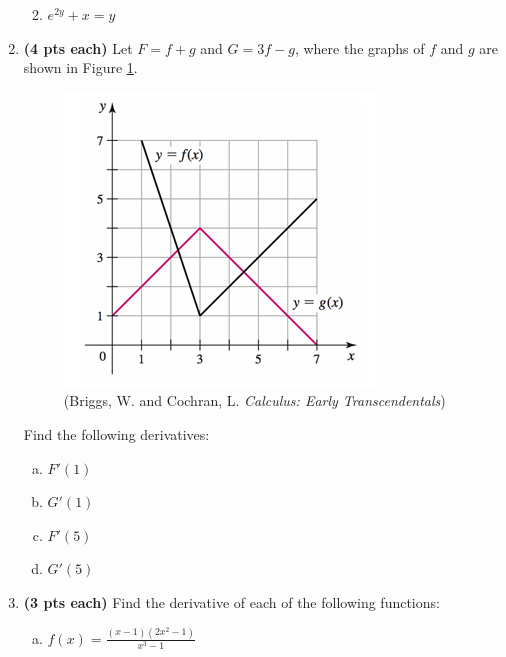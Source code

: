 \documentclass[12pt,letterpaper]{article}
\begin{document}
\begin{enumerate}[1.]
\begin{enumerate}
	\vspace{25pc}
	\item $e^{2y}+x=y$
	\end{enumerate}

\newpage	
\item {\bf (4 pts each)} Let $F=f+g$ and $G=3f-g$, where the graphs of $f$ and $g$ are shown in Figure \ref{fig:graphDeriv}.

\vspace{-0.5pc}  
\begin{figure}[h]
\begin{center}
\includegraphics[scale=0.8]{Exam2graphDeriv.png}
\caption{(Briggs, W. and Cochran, L. \emph{Calculus: Early Transcendentals})}
\label{fig:graphDeriv}
\end{center}
\end{figure}

Find the following derivatives:
	\begin{enumerate}[(a)]
	\item $F'(1)$
	
	\vspace{6pc}
	\item $G'(1)$
	
	\vspace{6pc}
	\item $F'(5)$
	
	\vspace{6pc}
	\item $G'(5)$
	\end{enumerate}
		
\newpage
\item {\bf (3 pts each)} Find the derivative of each of the following functions:
	\begin{enumerate}[(a)]
	\item $\displaystyle f(x)=\frac{(x-1)(2x^2-1)}{x^3-1}$
	

\end{enumerate}
\end{enumerate}
\end{document}
